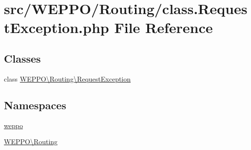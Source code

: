 \hypertarget{class_8RequestException_8php}{}\section{src/\+W\+E\+P\+P\+O/\+Routing/class.Request\+Exception.\+php File Reference}
\label{class_8RequestException_8php}
\subsection*{Classes}
\begin{DoxyCompactItemize}
\item 
class \hyperlink{classWEPPO_1_1Routing_1_1RequestException}{W\+E\+P\+P\+O\textbackslash{}\+Routing\textbackslash{}\+Request\+Exception}
\end{DoxyCompactItemize}
\subsection*{Namespaces}
\begin{DoxyCompactItemize}
\item 
 \hyperlink{namespaceweppo}{weppo}
\item 
 \hyperlink{namespaceWEPPO_1_1Routing}{W\+E\+P\+P\+O\textbackslash{}\+Routing}
\end{DoxyCompactItemize}
